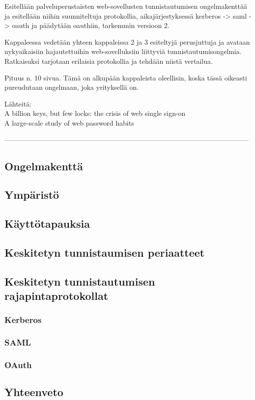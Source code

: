 Esitellään palveluperustaisten web-sovellusten tunnistautumisen ongelmakenttää ja esitellään niihin suunniteltuja protokollia, aikajärjestyksessä kerberos -> saml -> oauth ja päädytään oauthiin, tarkemmin versioon 2.

Kappaleessa vedetään yhteen kappaleissa 2 ja 3 esiteltyjä perusjuttuja ja avataan nykyaikaisiin hajautettuihin web-sovelluksiin liittyviä tunnistautumisongelmia. Ratkaisuksi tarjotaan erilaisia protokollia ja tehdään niistä vertailua.

Pituus n. 10 sivua. Tämä on alkupään kappaleista oleellisin, koska tässä oikeasti pureudutaan ongelmaan, joka yrityksellä on.

Lähteitä:\\
A billion keys, but few locks: the crisis of web single sign-on \cite{billion_keys}\\
A large-scale study of web password habits \cite{password_habits}

-----------------------------------------------------------------------------------------------------------


\subsection{Ongelmakenttä}

\subsection{Ympäristö}

\subsection{Käyttötapauksia}

\subsection{Keskitetyn tunnistaumisen periaatteet}

\subsection{Keskitetyn tunnistautumisen rajapintaprotokollat}

\subsubsection{Kerberos}

\subsubsection{SAML}

\subsubsection{OAuth}

\subsection{Yhteenveto}

